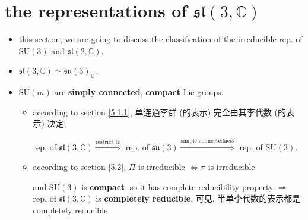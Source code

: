 \section{the representations of \texorpdfstring{$\mathfrak{sl}(3, \mathbb{C})$}{sl(3, C)}}
\begin{itemize}
	\item this section, we are going to discuss the classification of the irreducible rep. of $\mathrm{SU}(3)$ and $\mathfrak{sl}(2, \mathbb{C})$.
	
	\item $\mathfrak{sl}(3, \mathbb{C}) \simeq \mathfrak{su}(3)_\mathbb{C}$.
	
	\item $\mathrm{SU}(m)$ are \textbf{simply connected}, \textbf{compact} Lie groups.
	\begin{itemize}
		\item according to section \ref{5.1.1}, 单连通李群 (的表示) 完全由其李代数 (的表示) 决定.
		
		rep. of $\mathfrak{sl}(3, \mathbb{C}) \overset{\text{restrict to}}{\Longrightarrow}$ rep. of $\mathfrak{su}(3) \overset{\text{simple connectedness}}{\Longrightarrow}$ rep. of $\mathrm{SU}(3)$.
		
		\item according to section \ref{5.2}, $\Pi$ is irreducible $\iff \pi$ is irreducible.
		
		and $\mathrm{SU}(3)$ is \textbf{compact}, so it has complete reducibility property $\Longrightarrow$ rep. of $\mathfrak{sl}(3, \mathbb{C})$ is \textbf{completely reducible}. 可见, 半单李代数的表示都是 completely reducible.
	\end{itemize}
\end{itemize}
